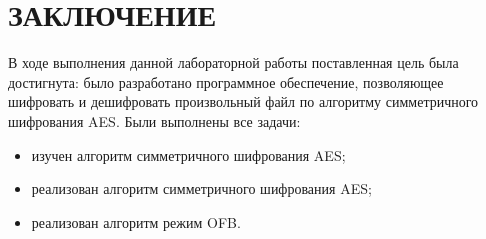 \section*{ЗАКЛЮЧЕНИЕ}
{}

В ходе выполнения данной лабораторной работы поставленная цель была достигнута: было разработано программное обеспечение, позволяющее шифровать и дешифровать произвольный файл по алгоритму симметричного шифрования AES.
Были выполнены все задачи:
\begin{itemize}
	\item изучен алгоритм симметричного шифрования AES;
	\item реализован алгоритм симметричного шифрования AES;
	\item реализован алгоритм режим OFB.
\end{itemize}

\newpage